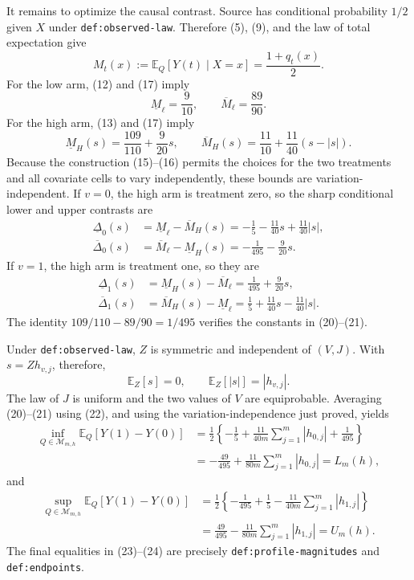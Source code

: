 It remains to optimize the causal contrast.  Source has conditional
probability \(1/2\) given \(X\) under
\texttt{def:observed-law}.  Therefore (5), (9), and the law of total
expectation give
\[
 M_t(x):=\mathbb E_Q[Y(t)\mid X=x]=\frac{1+q_t(x)}2.
 \tag{17}
\]
For the low arm, (12) and (17) imply
\[
 \underline M_{\ell}=\frac9{10},
 \qquad
 \overline M_{\ell}=\frac{89}{90}.
 \tag{18}
\]
For the high arm, (13) and (17) imply
\[
 \underline M_H(s)=\frac{109}{110}+\frac9{20}s,
 \qquad
 \overline M_H(s)=\frac{11}{10}
      +\frac{11}{40}(s-|s|).
 \tag{19}
\]
Because the construction (15)--(16) permits the choices for the two
treatments and all covariate cells to vary independently, these bounds
are variation-independent.  If \(v=0\), the high arm is treatment
zero, so the sharp conditional lower and upper contrasts are
\[
 \begin{aligned}
 \underline\Delta_0(s)
   &=\underline M_{\ell}-\overline M_H(s)
     =-\frac15-\frac{11}{40}s+\frac{11}{40}|s|,\\
 \overline\Delta_0(s)
   &=\overline M_{\ell}-\underline M_H(s)
     =-\frac1{495}-\frac9{20}s.
 \end{aligned}
 \tag{20}
\]
If \(v=1\), the high arm is treatment one, so they are
\[
 \begin{aligned}
 \underline\Delta_1(s)
   &=\underline M_H(s)-\overline M_{\ell}
     =\frac1{495}+\frac9{20}s,\\
 \overline\Delta_1(s)
   &=\overline M_H(s)-\underline M_{\ell}
     =\frac15+\frac{11}{40}s-\frac{11}{40}|s|.
 \end{aligned}
 \tag{21}
\]
The identity \(109/110-89/90=1/495\) verifies the constants in
(20)--(21).

Under \texttt{def:observed-law}, \(Z\) is symmetric and independent
of \((V,J)\).  With \(s=Zh_{v,j}\), therefore,
\[
 \mathbb E_Z[s]=0,
 \qquad
 \mathbb E_Z[|s|]=|h_{v,j}|.
 \tag{22}
\]
The law of \(J\) is uniform and the two values of \(V\) are
equiprobable.  Averaging (20)--(21) using (22), and using the
variation-independence just proved, yields
\[
 \begin{aligned}
 \inf_{Q\in\mathcal M_{m,h}}\mathbb E_Q[Y(1)-Y(0)]
 &=\frac12\left\{-\frac15+
       \frac{11}{40m}\sum_{j=1}^m|h_{0,j}|+\frac1{495}\right\}\\
 &=-\frac{49}{495}+\frac{11}{80m}
       \sum_{j=1}^m|h_{0,j}|=L_m(h),
 \end{aligned}
 \tag{23}
\]
and
\[
 \begin{aligned}
 \sup_{Q\in\mathcal M_{m,h}}\mathbb E_Q[Y(1)-Y(0)]
 &=\frac12\left\{-\frac1{495}+\frac15-
       \frac{11}{40m}\sum_{j=1}^m|h_{1,j}|\right\}\\
 &=\frac{49}{495}-\frac{11}{80m}
       \sum_{j=1}^m|h_{1,j}|=U_m(h).
 \end{aligned}
 \tag{24}
\]
The final equalities in (23)--(24) are precisely
\texttt{def:profile-magnitudes} and \texttt{def:endpoints}.

